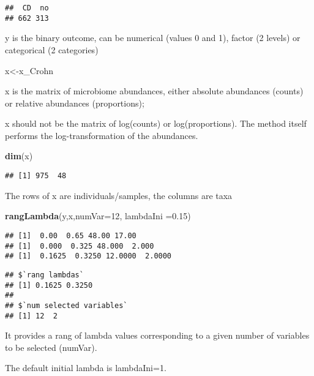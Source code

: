 \documentclass[]{book}
\newenvironment{Shaded}{\begin{snugshade}}{\end{snugshade}}
\newcommand{\KeywordTok}[1]{\textcolor[rgb]{0.13,0.29,0.53}{\textbf{#1}}}
\newcommand{\DataTypeTok}[1]{\textcolor[rgb]{0.13,0.29,0.53}{#1}}
\newcommand{\DecValTok}[1]{\textcolor[rgb]{0.00,0.00,0.81}{#1}}
\newcommand{\FloatTok}[1]{\textcolor[rgb]{0.00,0.00,0.81}{#1}}
\newcommand{\NormalTok}[1]{#1}
\begin{document}
\begin{verbatim}
##  CD  no 
## 662 313
\end{verbatim}

y is the binary outcome, can be numerical (values 0 and 1), factor (2
levels) or categorical (2 categories)

\begin{Shaded}
\begin{Highlighting}[]
\NormalTok{x<-x_Crohn }
\end{Highlighting}
\end{Shaded}

x is the matrix of microbiome abundances, either absolute abundances
(counts) or relative abundances (proportions);

x should not be the matrix of log(counts) or log(proportions). The
method itself performs the log-transformation of the abundances.

\begin{Shaded}
\begin{Highlighting}[]
\KeywordTok{dim}\NormalTok{(x)}
\end{Highlighting}
\end{Shaded}

\begin{verbatim}
## [1] 975  48
\end{verbatim}

The rows of x are individuals/samples, the columns are taxa

\begin{Shaded}
\begin{Highlighting}[]
\KeywordTok{rangLambda}\NormalTok{(y,x,}\DataTypeTok{numVar=}\DecValTok{12}\NormalTok{, }\DataTypeTok{lambdaIni =}\FloatTok{0.15}\NormalTok{)}
\end{Highlighting}
\end{Shaded}

\begin{verbatim}
## [1]  0.00  0.65 48.00 17.00
## [1]  0.000  0.325 48.000  2.000
## [1]  0.1625  0.3250 12.0000  2.0000
\end{verbatim}

\begin{verbatim}
## $`rang lambdas`
## [1] 0.1625 0.3250
## 
## $`num selected variables`
## [1] 12  2
\end{verbatim}

It provides a rang of lambda values corresponding to a given number of
variables to be selected (numVar).

The default initial lambda is lambdaIni=1.
\end{document}
